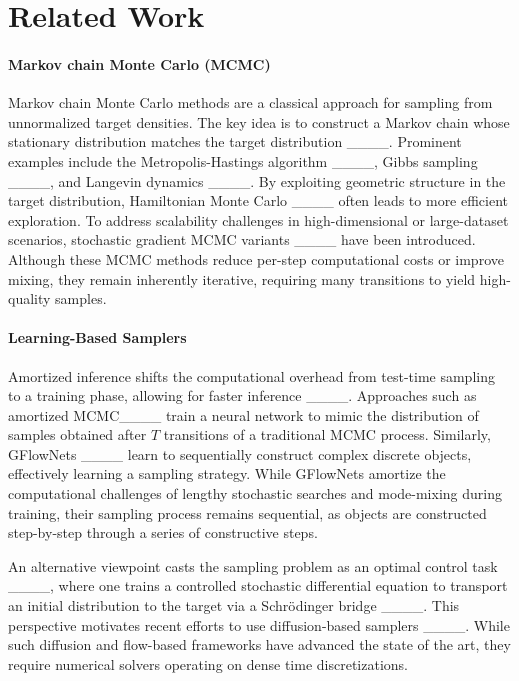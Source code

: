 \section{Related Work}
\label{sec:related-work}
\paragraph{Markov chain Monte Carlo (MCMC)}
Markov chain Monte Carlo methods are a classical approach for sampling from unnormalized target densities. 
The key idea is to construct a Markov chain whose stationary distribution matches the target distribution ____. 
Prominent examples include the Metropolis-Hastings algorithm ____, Gibbs sampling ____, and Langevin dynamics ____. 
By exploiting geometric structure in the target distribution, Hamiltonian Monte Carlo ____ often leads to more efficient exploration. 
To address scalability challenges in high-dimensional or large-dataset scenarios, stochastic gradient MCMC variants ____ have been introduced. 
Although these MCMC methods reduce per-step computational costs or improve mixing, they remain inherently iterative, requiring many transitions to yield high-quality samples.

\paragraph{Learning-Based Samplers}
Amortized inference shifts the computational overhead from test-time sampling to a training phase, allowing for faster inference ____. 
Approaches such as amortized MCMC____ train a neural network to mimic the distribution of samples obtained after $T$ transitions of a traditional MCMC process. 
Similarly, GFlowNets ____ learn to sequentially construct complex discrete objects, effectively learning a sampling strategy. 
While GFlowNets amortize the computational challenges of lengthy stochastic searches and mode-mixing
during training, their sampling process remains sequential, as objects are constructed step-by-step
through a series of constructive steps.

An alternative viewpoint casts the sampling problem as an optimal control task ____, where one trains a controlled stochastic differential equation to transport an initial distribution to the target via a Schrödinger bridge ____. 
This perspective motivates recent efforts to use diffusion-based samplers ____. 
While such diffusion and flow-based frameworks have advanced the state of the art, they require numerical solvers operating on dense time discretizations.

